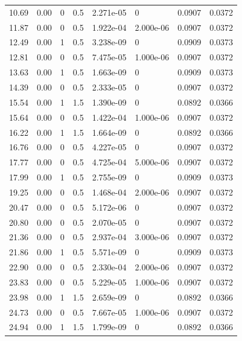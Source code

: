 \documentclass[preview]{standalone}
\begin{document}
{{\begin{tabular}{L{1.2cm}C{1.2cm} C{0.3cm}C{0.5cm} C{1.4cm}C{1.4cm} C{1.4cm}C{1.4cm}}
  10.69  &  0.00  & 0     & 0.5 &  2.271e-05  & 0  & 0.0907 &  0.0372   \\ 
  11.87  &  0.00  & 0     & 0.5 &  1.922e-04  & 2.000e-06  & 0.0907 &  0.0372   \\ 
  12.49  &  0.00  & 1     & 0.5 &  3.238e-09  & 0  & 0.0909 &  0.0373   \\ 
  12.81  &  0.00  & 0     & 0.5 &  7.475e-05  & 1.000e-06  & 0.0907 &  0.0372   \\ 
  13.63  &  0.00  & 1     & 0.5 &  1.663e-09  & 0  & 0.0909 &  0.0373   \\ 
  14.39  &  0.00  & 0     & 0.5 &  2.333e-05  & 0  & 0.0907 &  0.0372   \\ 
  15.54  &  0.00  & 1     & 1.5 &  1.390e-09  & 0  & 0.0892 &  0.0366   \\ 
  15.64  &  0.00  & 0     & 0.5 &  1.422e-04  & 1.000e-06  & 0.0907 &  0.0372   \\ 
  16.22  &  0.00  & 1     & 1.5 &  1.664e-09  & 0  & 0.0892 &  0.0366   \\ 
  16.76  &  0.00  & 0     & 0.5 &  4.227e-05  & 0  & 0.0907 &  0.0372   \\ 
  17.77  &  0.00  & 0     & 0.5 &  4.725e-04  & 5.000e-06  & 0.0907 &  0.0372   \\ 
  17.99  &  0.00  & 1     & 0.5 &  2.755e-09  & 0  & 0.0909 &  0.0373   \\ 
  19.25  &  0.00  & 0     & 0.5 &  1.468e-04  & 2.000e-06  & 0.0907 &  0.0372   \\ 
  20.47  &  0.00  & 0     & 0.5 &  5.172e-06  & 0  & 0.0907 &  0.0372   \\ 
  20.80  &  0.00  & 0     & 0.5 &  2.070e-05  & 0  & 0.0907 &  0.0372   \\ 
  21.36  &  0.00  & 0     & 0.5 &  2.937e-04  & 3.000e-06  & 0.0907 &  0.0372   \\ 
  21.86  &  0.00  & 1     & 0.5 &  5.571e-09  & 0  & 0.0909 &  0.0373   \\ 
  22.90  &  0.00  & 0     & 0.5 &  2.330e-04  & 2.000e-06  & 0.0907 &  0.0372   \\ 
  23.83  &  0.00  & 0     & 0.5 &  5.229e-05  & 1.000e-06  & 0.0907 &  0.0372   \\ 
  23.98  &  0.00  & 1     & 1.5 &  2.659e-09  & 0  & 0.0892 &  0.0366   \\ 
  24.73  &  0.00  & 0     & 0.5 &  7.667e-05  & 1.000e-06  & 0.0907 &  0.0372   \\ 
  24.94  &  0.00  & 1     & 1.5 &  1.799e-09  & 0  & 0.0892 &  0.0366   \\ 

\end{tabular}}}
\end{document}
